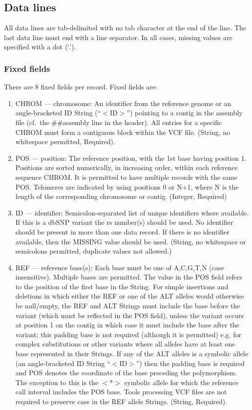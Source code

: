 \documentclass[8pt]{article}
\begin{document}
\subsection{Data lines}
\label{data-lines}
All data lines are tab-delimited with no tab character at the end of the line.
The last data line must end with a line separator.
In all cases, missing values are specified with a dot (`.').

\subsubsection{Fixed fields}
\label{fixed-fields}
There are 8 fixed fields per record.
Fixed fields are:

\begin{enumerate}
  \item CHROM --- chromosome: An identifier from the reference genome or an angle-bracketed ID String (``$<$ID$>$'') pointing to a contig in the assembly file (cf.\ the \#\#assembly line in the header).
  All entries for a specific CHROM must form a contiguous block within the VCF file.
  (String, no whitespace permitted, Required).
  \item POS --- position: The reference position, with the 1st base having position 1.
  Positions are sorted numerically, in increasing order, within each reference sequence CHROM.
  It is permitted to have multiple records with the same POS.
  Telomeres are indicated by using positions 0 or N+1, where N is the length of the corresponding chromosome or contig.
  (Integer, Required)
  \item ID --- identifier: Semicolon-separated list of unique identifiers where available.
  If this is a dbSNP variant the rs number(s) should be used.
  No identifier should be present in more than one data record.
  If there is no identifier available, then the MISSING value should be used.
  (String, no whitespace or semicolons permitted, duplicate values not allowed.)
  \item REF --- reference base(s): Each base must be one of A,C,G,T,N (case insensitive).
  Multiple bases are permitted.
  The value in the POS field refers to the position of the first base in the String.
  For simple insertions and deletions in which either the REF or one of the ALT alleles would otherwise be null/empty, the REF and ALT Strings must include the base before the variant (which must be reflected in the POS field), unless the variant occurs at position 1 on the contig in which case it must include the base after the variant; this padding base is not required (although it is permitted) e.g. for complex substitutions or other variants where all alleles have at least one base represented in their Strings.
  If any of the ALT alleles is a symbolic allele (an angle-bracketed ID String ``$<$ID$>$'') then the padding base is required and POS denotes the coordinate of the base preceding the polymorphism.
  The exception to this is the $<$*$>$ symbolic allele for which the reference call interval includes the POS base.
  Tools processing VCF files are not required to preserve case in the REF allele Strings. (String, Required).


\end{enumerate}
\end{document}

